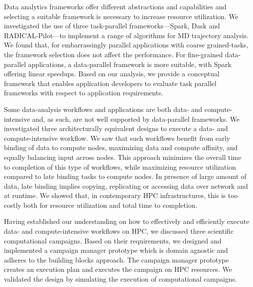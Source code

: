 Data analytics frameworks offer different abstractions and capabilities and
selecting a suitable framework is necessary to increase resource
utilization. We investigated the
use of three task-parallel frameworks---Spark, Dask and RADICAL-Pilot---to
implement a range of algorithms for MD trajectory analysis. We found that, for
embarrassingly parallel applications with coarse grained-tasks, the framework
selection does not affect the performance. For fine-grained data-parallel
applications, a data-parallel framework is more suitable, with Spark offering
linear speedups. Based on our analysis, we provide a conceptual framework that
enables application developers to evaluate task parallel frameworks with respect
to application requirements.

Some data-analysis workflows and applications are both data- and
compute-intensive and, as such, are not well supported by data-parallel
frameworks. We investigated three architecturally equivalent designs to execute
a data- and compute-intensive workflow. We saw that such workflows benefit from
early binding of data to compute nodes, maximizing data and compute affinity,
and equally balancing input across nodes. This approach minimizes the overall
time to completion of this type of workflows, while maximizing resource
utilization compared to late binding tasks to compute nodes. In presence of
large amount of data, late binding implies copying, replicating or accessing
data over network and at runtime. We showed that, in contemporary HPC
infrastructures, this is too costly both for resource utilization and total time
to completion.

Having established our understanding on how to effectively and efficiently
execute data- and compute-intensive workflows on HPC, we discussed three
scientific computational campaigns. Based on their requirements, we designed and
implemented a campaign manager prototype which is domain agnostic and adheres to
the building blocks approach. The campaign manager prototype creates an
execution plan and executes the campaign on HPC resources. We validated the
design by simulating the execution of computational campaigns.

